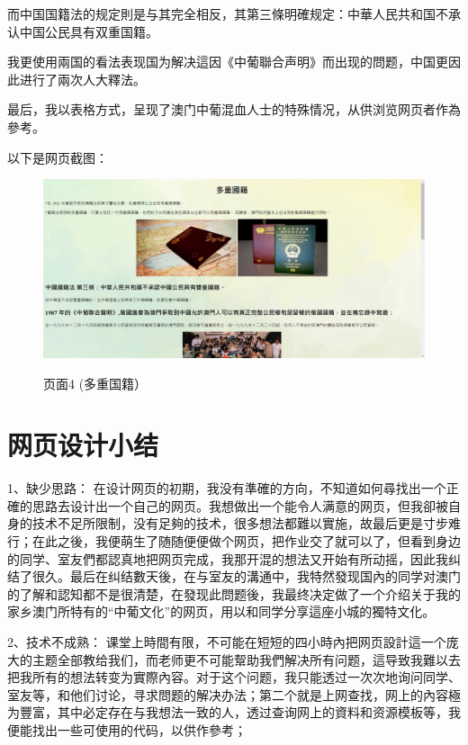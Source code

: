 \documentclass[supercite]{Experimental_Report}
\theoremstyle{definition}
\begin{document}
	而中国国籍法的规定則是与其完全相反，其第三條明確规定：中華人民共和国不承认中国公民具有双重国籍。
	
	我更使用兩国的看法表现国为解决這因《中葡聯合声明》而出现的問题，中国更因此进行了兩次人大釋法。
	
	最后，我以表格方式，呈现了澳门中葡混血人士的特殊情况，从供浏览网页者作為參考。
	
	以下是网页截图：
	
	
	\begin{figure}[htb] %
		\begin{center}
			\includegraphics[scale=0.30]{images/3-4.jpg}
			\label{fig3-4}
			\caption{页面4 (多重国籍）}
		\end{center}
	\end{figure}
	
	\newpage
	
	\section{网页设计小结}
	1、缺少思路：
	在设计网页的初期，我没有準確的方向，不知道如何尋找出一个正確的思路去设计出一个自己的网页。我想做出一个能令人满意的网页，但我卻被自身的技术不足所限制，没有足夠的技术，很多想法都難以實施，故最后更是寸步难行；在此之後，我便萌生了随随便便做个网页，把作业交了就可以了，但看到身边的同学、室友們都認真地把网页完成，我那开混的想法又开始有所动摇，因此我纠结了很久。最后在纠结數天後，在与室友的溝通中，我特然發现国內的同学对澳门的了解和認知都不是很清楚，在發现此問题後，我最终决定做了一个介绍关于我的家乡澳门所特有的“中葡文化”的网页，用以和同学分享這座小城的獨特文化。
	
	2、技术不成熟：
	课堂上時間有限，不可能在短短的四小時內把网页設計這一个庞大的主题全部教给我们，而老师更不可能幚助我們解决所有问题，這导致我難以去把我所有的想法转变为實際內容。对于这个问题，我只能透过一次次地询问同学、室友等，和他们讨论，寻求問题的解决办法；第二个就是上网查找，网上的內容極为豐富，其中必定存在与我想法一致的人，透过查询网上的資料和资源模板等，我便能找出一些可使用的代码，以供作參考；
	
\end{document}

